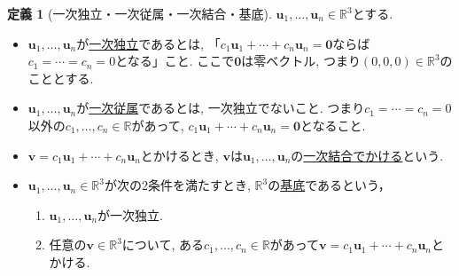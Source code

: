 \documentclass[dvipdfmx,a4paper,11pt]{article}
\newcommand{\R}{\mathbb{R}}
\theoremstyle{definition}
\newtheorem{dfn}[thm]{定義}
\begin{document}
 
\begin{tcolorbox}[
    colback = white,
    colframe = green!35!black,
    fonttitle = \bfseries,
    breakable = true]
    \begin{dfn}[一次独立・一次従属・一次結合・基底]
  $\bm{u}_1, \ldots, \bm{u}_n \in \R^3$とする. 
    \begin{itemize}
	\setlength{\parskip}{0cm}
  	\setlength{\itemsep}{0pt} 
\item $\bm{u}_1, \ldots, \bm{u}_n $が\underline{一次独立}であるとは, 
「$c_1\bm{u}_1 + \cdots+ c_n\bm{u}_n = \bm{0}$ならば$c_1=\cdots =c_n =0$となる」こと.
ここで$\bm{0}$は零ベクトル, つまり$(0,0,0) \in \R^3$のこととする.
\item $\bm{u}_1, \ldots, \bm{u}_n $が\underline{一次従属}であるとは, 
一次独立でないこと. つまり$c_1=\cdots =c_n =0$以外の$c_1, \ldots, c_n \in \R$があって, $c_1\bm{u}_1 + \cdots + c_n\bm{u}_n = \bm{0}$となること.
\item $\bm{v} = c_1\bm{u}_1 + \cdots + c_n\bm{u}_n $とかけるとき, $\bm{v}$は$\bm{u}_1, \ldots, \bm{u}_n$の\underline{一次結合でかける}という.
 \item $\bm{u}_1, \ldots, \bm{u}_n \in \R^3$が次の2条件を満たすとき, $\R^3$の\underline{基底}であるという， 
    \begin{enumerate}
	\setlength{\parskip}{0cm}
  	\setlength{\itemsep}{0pt} 
\item $\bm{u}_1, \ldots, \bm{u}_n $が一次独立.
\item 任意の$\bm{v} \in \R^3$について, ある$c_1, \ldots, c_n \in \R$があって$\bm{v} = c_1\bm{u}_1 + \cdots + c_n\bm{u}_n $とかける.
\end{enumerate}
\end{itemize}
    \end{dfn}
 \end{tcolorbox}
\end{document}
